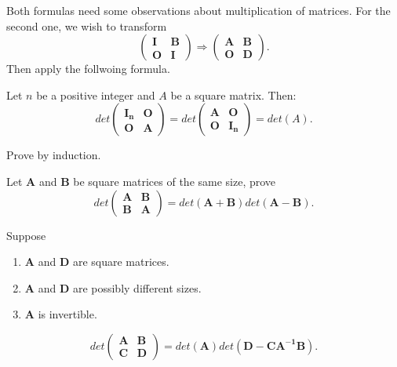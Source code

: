 \documentclass[12pt]{article}
\begin{document}
\begin{pf}
    Both formulas need some observations about multiplication of matrices.
    For the second one, we wish to transform 
    \[\begin{pmatrix}
\mathbf{I} & \mathbf{B}\\
\mathbf{O} & \mathbf{I}
\end{pmatrix}\Rightarrow\begin{pmatrix}
\mathbf{A} & \mathbf{B}\\
\mathbf{O} & \mathbf{D}
\end{pmatrix}.\]
Then apply the follwoing formula.
\end{pf}

\begin{theorem}
    Let $n$ be a positive integer and $A$ be a square matrix. Then:
    \[det\begin{pmatrix}
\mathbf{I_n} & \mathbf{O}\\
\mathbf{O} & \mathbf{A}
\end{pmatrix}=det\begin{pmatrix}
\mathbf{A} & \mathbf{O}\\
\mathbf{O} & \mathbf{I_n}
\end{pmatrix}=det(A).\]
\end{theorem}

\begin{pf}
    Prove by induction.
\end{pf}

\begin{exercise}
Let $\textbf{A}$ and $\textbf{B}$ be square matrices of the same size, prove 
\[det\begin{pmatrix}
\mathbf{A} & \mathbf{B}\\
\mathbf{B} & \mathbf{A}
\end{pmatrix} = det(\mathbf{A}+\mathbf{B})det(\mathbf{A}-\mathbf{B}).\]
\end{exercise}


\begin{theorem}
    Suppose
    \begin{enumerate}
       \item $\textbf{A}$ and $\textbf{D}$ are square matrices.
       \item $\textbf{A}$ and $\textbf{D}$ are possibly different sizes.
       \item $\textbf{A}$ is invertible. 
    \end{enumerate}
    \[det\begin{pmatrix}
\mathbf{A} & \mathbf{B}\\
\mathbf{C} & \mathbf{D}
\end{pmatrix} = det(\mathbf{A})det(\mathbf{D}-\mathbf{CA^{-1}B}).\]
\end{theorem}
\end{document}
